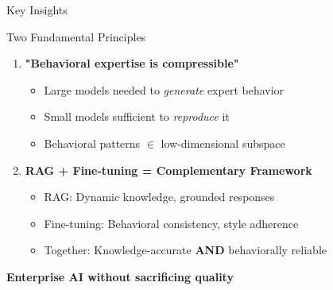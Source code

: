 \documentclass[aspectratio=169]{beamer}
\begin{document}

\begin{frame}{Key Insights}
\begin{block}{Two Fundamental Principles}
\begin{enumerate}
    \item \textbf{"Behavioral expertise is compressible"}
    \begin{itemize}
        \item Large models needed to \textit{generate} expert behavior
        \item Small models sufficient to \textit{reproduce} it
        \item Behavioral patterns $\in$ low-dimensional subspace
    \end{itemize}
    
    \item \textbf{RAG + Fine-tuning = Complementary Framework}
    \begin{itemize}
        \item RAG: Dynamic knowledge, grounded responses
        \item Fine-tuning: Behavioral consistency, style adherence
        \item Together: Knowledge-accurate \textbf{AND} behaviorally reliable
    \end{itemize}
\end{enumerate}
\end{block}

\vspace{0.3cm}
\begin{center}
\textcolor{torusblue}{\large \textbf{Enterprise AI without sacrificing quality}}
\end{center}
\end{frame}
\end{document}
